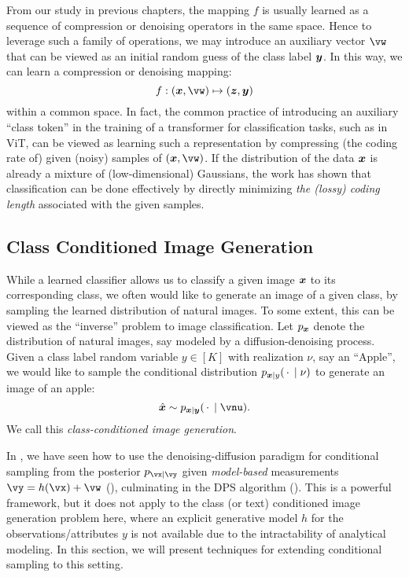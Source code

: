 \documentclass[../../book-main.tex]{subfiles}
\begin{document}
From our study in previous chapters, the mapping $f$ is usually learned as a sequence of compression or denoising operators in the same space. Hence to leverage such a family of operations, we may introduce an auxiliary vector $\vw$ that can be viewed as an initial random guess of the class label $\bm{y}$. In this way, we can learn a compression or denoising mapping:
\begin{equation}\label{eq:classifier-with-class-token}
    f: (\x, \vw) \mapsto (\z, \y)
\end{equation}
within a common space. In fact, the common practice of introducing an auxiliary ``class token'' in the training of a transformer for classification tasks, such as in ViT, can be viewed as learning such a representation by compressing (the coding rate of) given (noisy) samples of $(\x, \vw)$. If the distribution of the data $\bm{x}$ is already a mixture of (low-dimensional) Gaussians, the work \cite{wright2008classification} has shown that classification can be done effectively by directly minimizing {\em the (lossy) coding length} associated with the given samples.


\subsection{Class Conditioned Image Generation}\label{sub:cfg} 
While a learned classifier allows us to classify a given image $\bm{x}$ to its
corresponding class, we often would like to generate an image of a given class, by
sampling the learned distribution of natural images. To some extent, this can be
viewed as the ``inverse'' problem to image classification. Let $p_{\bm{x}}$ denote
the distribution of natural images, say modeled by a diffusion-denoising
process. Given a class label random variable $y \in [K]$ with realization $\nu$, say
an ``Apple'', we would like to sample the conditional distribution $p_{\bm{x} \mid
y}(\,\cdot\, \mid \nu)$ to generate an image of an apple:
\begin{equation}
  \hat{\x} \sim p_{\x\mid \y}(\,\cdot\, \mid \vnu).
\end{equation}
We call this {\em class-conditioned image generation}.

In , we have seen how to use the denoising-diffusion paradigm for
conditional sampling from the posterior $p_{\vx \mid \vy}$ given
\textit{model-based} measurements $\vy = h(\vx) + \vw$
(), culminating in the
DPS algorithm (). This is a powerful
framework, but it does not apply to the class (or text) conditioned image
generation problem here, where an explicit generative model $h$ for the
observations/attributes $y$ is not available due to the
intractability of analytical modeling. In this section, we will present techniques for extending
conditional sampling to this setting.
\end{document}
